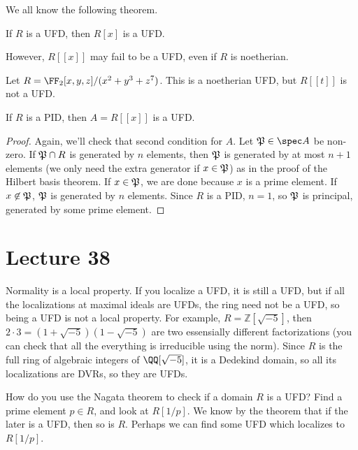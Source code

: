  We all know the following theorem.
 \begin{theorem}[Gauss]
   If $R$ is a UFD, then $R[x]$ is a UFD.
 \end{theorem}
 However, $R[[x]]$ may fail to be a UFD, even if $R$ is noetherian.
 \begin{example}
   Let $R=\FF_2[x,y,z]/(x^2+y^3+z^7)$. This is a noetherian UFD, but $R[[t]]$ is not a
   UFD.
 \end{example}
 \begin{theorem}
   If $R$ is a PID, then $A=R[[x]]$ is a UFD.
 \end{theorem}
 \begin{proof}
   Again, we'll check that second condition for $A$. Let $\P\in\spec A$ be non-zero. If
   $\P\cap R$ is generated by $n$ elements, then $\P$ is generated by at most $n+1$
   elements (we only need the extra generator if $x\in \P$) as in the proof of the
   Hilbert basis theorem. If $x\in \P$, we are done because $x$ is a prime element. If
   $x\not\in \P$, $\P$ is generated by $n$ elements. Since $R$ is a PID, $n=1$, so $\P$
   is principal, generated by some prime element.
 \end{proof}
 \setcounter{lecture}{38}
 \section{Lecture 38}

 Normality is a local property. If you localize a UFD, it is still a UFD, but if all the
 localizations at maximal ideals are UFDs, the ring need not be a UFD, so being a UFD is
 not a local property. For example, $R=\mathbb{Z}[\sqrt{-5}]$, then $2\cdot
 3=(1+\sqrt{-5})(1-\sqrt{-5})$ are two essensially different factorizations (you can
 check that all the everything is irreducible using the norm). Since $R$ is the full ring
 of algebraic integers of $\QQ[\sqrt{-5}]$, it is a Dedekind domain, so all its
 localizations are DVRs, so they are UFDs.

 How do you use the Nagata theorem to check if a domain $R$ is a UFD? Find a prime
 element $p\in R$, and look at $R[1/p]$. We know by the theorem that if the later is a
 UFD, then so is $R$. Perhaps we can find some UFD which localizes to $R[1/p]$.

